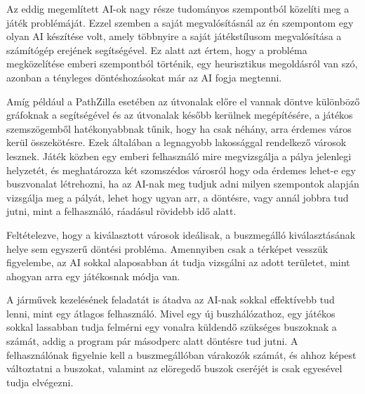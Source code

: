 
Az eddig megemlített AI-ok nagy része tudományos szempontból közelíti meg a játék problémáját. Ezzel szemben a saját megvalósításnál az én szempontom egy olyan AI készítése volt, amely többnyire a saját játékstílusom megvalósítása a számítógép erejének segítségével. Ez alatt azt értem, hogy a probléma megközelítése emberi szempontból történik, egy heurisztikus megoldásról van szó, azonban a tényleges döntéshozásokat már az AI fogja megtenni.

Amíg például a PathZilla esetében az útvonalak előre el vannak döntve különböző gráfoknak a segítségével és az útvonalak később kerülnek megépítésére, a játékos szemszögemből hatékonyabbnak tűnik, hogy ha csak néhány, arra érdemes város kerül összekötésre. Ezek általában a legnagyobb lakossággal rendelkező városok lesznek. Játék közben egy emberi felhasználó mire megvizsgálja a pálya jelenlegi helyzetét, és meghatározza két szomszédos városról hogy oda érdemes lehet-e egy buszvonalat létrehozni, ha az AI-nak meg tudjuk adni milyen szempontok alapján vizsgálja meg a pályát, lehet hogy ugyan arr, a döntésre, vagy annál jobbra tud jutni, mint a felhasználó, ráadásul rövidebb idő alatt.

Feltételezve, hogy a kiválasztott városok ideálisak, a buszmegálló kiválasztásának helye sem egyszerű döntési probléma. Amennyiben csak a térképet vesszük figyelembe, az AI sokkal alaposabban át tudja vizsgálni az adott területet, mint ahogyan arra egy játékosnak módja van.

A járművek kezelésének feladatát is átadva az AI-nak sokkal effektívebb tud lenni, mint egy átlagos felhasználó. Mivel egy új buszhálózathoz, egy játékos sokkal lassabban tudja felmérni egy vonalra küldendő szükséges buszoknak a számát, addig a program pár másodperc alatt döntésre tud jutni. A felhasználónak figyelnie kell a buszmegállóban várakozók számát, és ahhoz képest változtatni a buszokat, valamint az elöregedő buszok cseréjét is csak egyesével tudja elvégezni.
